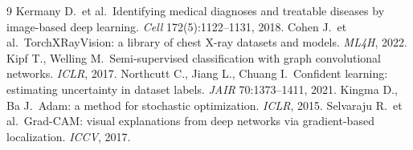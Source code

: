 
\begin{thebibliography}{9}
 Kermany D.\ et al.\ Identifying medical diagnoses and
treatable diseases by image-based deep learning. \emph{Cell}
172(5):1122--1131, 2018.
 Cohen J.\ et al.\ TorchXRayVision: a library of chest
X-ray datasets and models. \emph{ML4H}, 2022.
 Kipf T., Welling M.\ Semi-supervised classification with
graph convolutional networks. \emph{ICLR}, 2017.
 Northcutt C., Jiang L., Chuang I.\ Confident
learning: estimating uncertainty in dataset labels. \emph{JAIR}
70:1373--1411, 2021.
 Kingma D., Ba J.\ Adam: a method for stochastic
optimization. \emph{ICLR}, 2015.
 Selvaraju R.\ et al.\ Grad-CAM: visual explanations
from deep networks via gradient-based localization. \emph{ICCV}, 2017.
\end{thebibliography}
